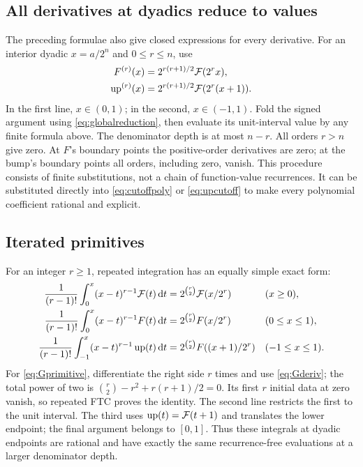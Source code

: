 \documentclass[11pt,oneside]{article}
\theoremstyle{definition}\newtheorem{definition}[theorem]{Definition}
\theoremstyle{remark}\newtheorem{remark}[theorem]{Remark}
\newcommand{\G}{\mathcal F}\newcommand{\eps}{\varepsilon}
\newcommand{\dd}{\,\mathrm d}\newcommand{\Comp}{\operatorname{Comp}}
\begin{document}
\subsection{All derivatives at dyadics reduce to values}
The preceding formulae also give closed expressions for every derivative.
For an interior dyadic $x=a/2^n$ and $0\le r\le n$, use
\begin{align}
 F^{(r)}(x)&=2^{r(r+1)/2}\G(2^rx),
 \label{eq:Fderivativeclosed}\\
 \Up^{(r)}(x)&=2^{r(r+1)/2}\G(2^r(x+1)).
 \label{eq:upderivativeclosed}
\end{align}
In the first line, $x\in(0,1)$; in the second, $x\in(-1,1)$.
Fold the signed argument using \eqref{eq:globalreduction}, then evaluate
its unit-interval value by any finite formula above. The denominator depth
is at most $n-r$. All orders $r>n$ give zero. At $F$'s boundary points the
positive-order derivatives are zero; at the bump's boundary points all
orders, including zero, vanish.
This procedure consists of finite substitutions, not a chain of function-value
recurrences. It can be substituted directly into
\eqref{eq:cutoffpoly} or \eqref{eq:upcutoff} to make every polynomial
coefficient rational and explicit.

\subsection{Iterated primitives}
For an integer $r\ge1$, repeated integration has an equally simple exact
form:
\begin{align}
 \frac1{(r-1)!}\int_0^x(x-t)^{r-1}\G(t)\dd t
 &=2^{\binom r2}\G(x/2^r) &&(x\ge0),
 \label{eq:Gprimitive}\\
 \frac1{(r-1)!}\int_0^x(x-t)^{r-1}F(t)\dd t
 &=2^{\binom r2}F(x/2^r) &&(0\le x\le1),
 \label{eq:Fprimitive}\\
 \frac1{(r-1)!}\int_{-1}^x(x-t)^{r-1}\Up(t)\dd t
 &=2^{\binom r2}F((x+1)/2^r) &&(-1\le x\le1).
 \label{eq:upprimitive}
\end{align}
For \eqref{eq:Gprimitive}, differentiate the right side $r$ times and use
\eqref{eq:Gderiv}; the total power of two is
$\binom r2-r^2+r(r+1)/2=0$. Its first $r$ initial data at zero vanish,
so repeated FTC proves the identity. The second line restricts the first
to the unit interval. The third uses $\Up(t)=\G(t+1)$ and translates the
lower endpoint; the final argument belongs to $[0,1]$.
Thus these integrals at dyadic endpoints are rational and have exactly the
same recurrence-free evaluations at a larger denominator depth.
\end{document}
